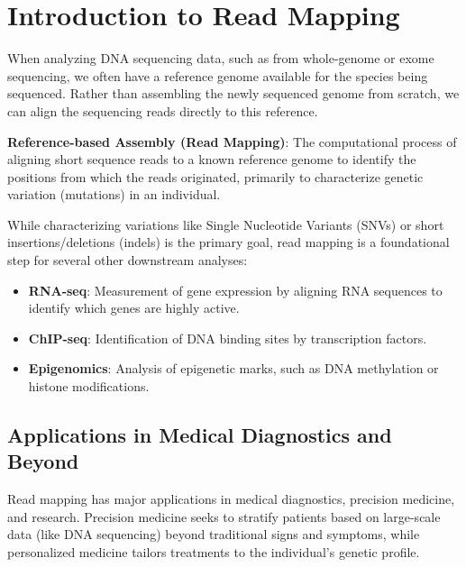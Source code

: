 


\section{Introduction to Read Mapping}

When analyzing DNA sequencing data, such as from whole-genome or exome sequencing, we often have a reference genome available for the species being sequenced. Rather than assembling the newly sequenced genome from scratch, we can align the sequencing reads directly to this reference.

\begin{important}
    \textbf{Reference-based Assembly (Read Mapping)}: The computational process of aligning short sequence reads to a known reference genome to identify the positions from which the reads originated, primarily to characterize genetic variation (mutations) in an individual.
\end{important}

While characterizing variations like Single Nucleotide Variants (SNVs) or short insertions/deletions (indels) is the primary goal, read mapping is a foundational step for several other downstream analyses:
\begin{itemize}
    \item \textbf{RNA-seq}: Measurement of gene expression by aligning RNA sequences to identify which genes are highly active.
    \item \textbf{ChIP-seq}: Identification of DNA binding sites by transcription factors.
    \item \textbf{Epigenomics}: Analysis of epigenetic marks, such as DNA methylation or histone modifications.
\end{itemize}

\subsection{Applications in Medical Diagnostics and Beyond}

Read mapping has major applications in medical diagnostics, precision medicine, and research. Precision medicine seeks to stratify patients based on large-scale data (like DNA sequencing) beyond traditional signs and symptoms, while personalized medicine tailors treatments to the individual's genetic profile.

